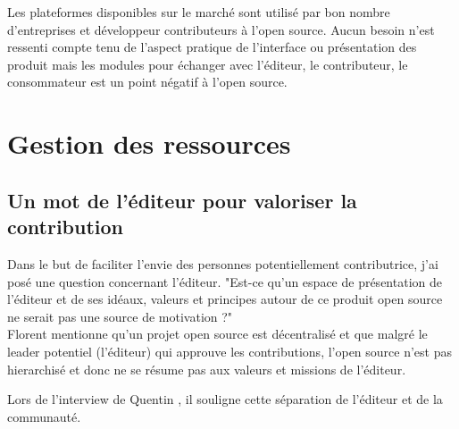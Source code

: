 		Les plateformes disponibles sur le marché sont utilisé par bon nombre d'entreprises et développeur contributeurs à l'open source. Aucun besoin n'est ressenti compte tenu de l'aspect pratique de l'interface ou présentation des produit mais les modules pour échanger avec l'éditeur, le contributeur, le consommateur est un point négatif à l'open source.

	\section{Gestion des ressources}

		\subsection{Un mot de l'éditeur pour valoriser la contribution}

			Dans le but de faciliter l'envie des personnes potentiellement contributrice, j'ai posé une question concernant l'éditeur. "Est-ce qu'un espace de présentation de l'éditeur et de ses idéaux, valeurs et principes autour de ce produit open source ne serait pas une source de motivation ?"\\

			Florent  mentionne qu'un projet open source est décentralisé et que malgré le leader potentiel (l'éditeur) qui approuve les contributions, l'open source n'est pas hierarchisé et donc ne se résume pas aux valeurs et missions de l'éditeur.

			\begin{center}
				\textit{
				}
			\end{center}

			Lors de l'interview de Quentin , il souligne cette séparation de l'éditeur et de la communauté.
			\begin{center}
				\textit{
				}
			\end{center}


